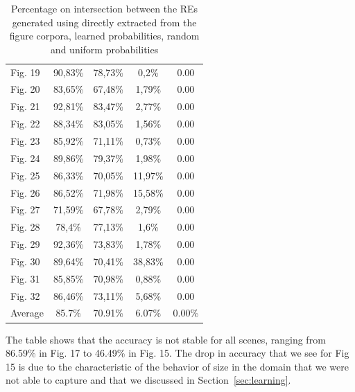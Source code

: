 \begin{table}[h!]
\begin{center}
\begin{tabular}{|l|c|c|c|c|}
Fig. 19	&	90,83\%	&	78,73\%	&	0,2\%	&	0.00\\%
Fig. 20	&	83,65\%	&	67,48\%	&	1,79\%	&	0.00\\%
Fig. 21	&	92,81\%	&	83,47\%	&	2,77\%	&	0.00\\%
Fig. 22	&	88,34\%	&	83,05\%	&	1,56\%	&	0.00\\%
Fig. 23	&	85,92\%	&	71,11\%	&	0,73\%	&	0.00\\%
Fig. 24	&	89,86\%	&	79,37\%	&	1,98\%	&	0.00\\%
Fig. 25	&	86,33\%	&	70,05\%	&	11,97\%	&	0.00\\%
Fig. 26	&	86,52\%	&	71,98\%	&	15,58\%	&	0.00\\%
Fig. 27	&	71,59\%	&	67,78\%	&	2,79\%	&	0.00\\%
Fig. 28	&	78,4\%	&	77,13\%	&	1,6\%	&	0.00\\%
Fig. 29	&	92,36\%	&	73,83\%	&	1,78\%	&	0.00\\%
Fig. 30	&	89,64\%	&	70,41\%	&	38,83\%	&	0.00\\%
Fig. 31	&	85,85\%	&	70,98\%	&	0,88\%	&	0.00\\%
Fig. 32	&	86,46\%	&	73,11\%	&	5,68\%	&	0.00\\%
\hline
Average	&	85.7\%	&	70.91\%	&	6.07\%	&	0.00\%	\\

\hline
\end{tabular}
\caption{Percentage on intersection between the REs generated using directly extracted from the figure corpora\label{results-algo-all}, learned probabilities, random and uniform probabilities}
\end{center}
\end{table}

The table shows that the accuracy is not stable for all scenes, ranging from 86.59\% in Fig. 17 to 46.49\% in Fig. 15. The drop in accuracy that we see for Fig 15 is due to the characteristic of the behavior of size in the domain that we were not able to capture and that we discussed in Section~\ref{sec:learning}. 


